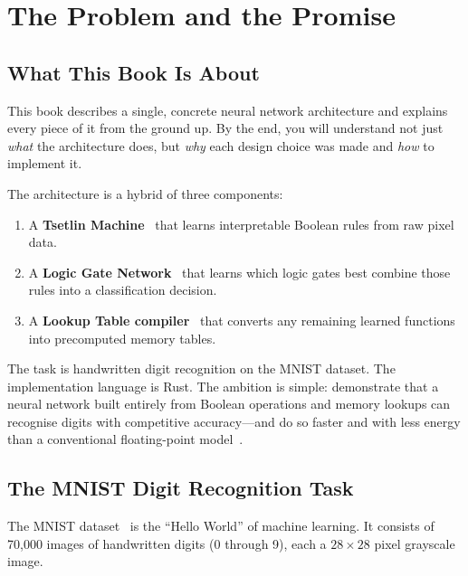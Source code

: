 \chapter{The Problem and the Promise}
\label{ch:problem}

\section{What This Book Is About}

This book describes a single, concrete neural network architecture and
explains every piece of it from the ground up. By the end, you will
understand not just \emph{what} the architecture does, but \emph{why}
each design choice was made and \emph{how} to implement it.

The architecture is a hybrid of three components:
\begin{enumerate}
  \item A \textbf{Tsetlin Machine}~\cite{granmo2018tsetlin} that learns interpretable Boolean
    rules from raw pixel data.
  \item A \textbf{Logic Gate Network}~\cite{petersen2022difflogic} that learns which logic gates
    best combine those rules into a classification decision.
  \item A \textbf{Lookup Table compiler}~\cite{liu2024kan} that converts any remaining
    learned functions into precomputed memory tables.
\end{enumerate}

The task is handwritten digit recognition on the MNIST dataset. The
implementation language is Rust. The ambition is simple: demonstrate
that a neural network built entirely from Boolean operations and memory
lookups can recognise digits with competitive accuracy---and do so
faster and with less energy than a conventional floating-point model~\cite{horowitz2014energy}.


\section{The MNIST Digit Recognition Task}
\label{sec:mnist-task}

The MNIST dataset~\cite{lecun1998mnist} is the ``Hello World'' of
machine learning. It consists of 70,000 images of handwritten digits
(0 through 9), each a $28 \times 28$ pixel grayscale image.

